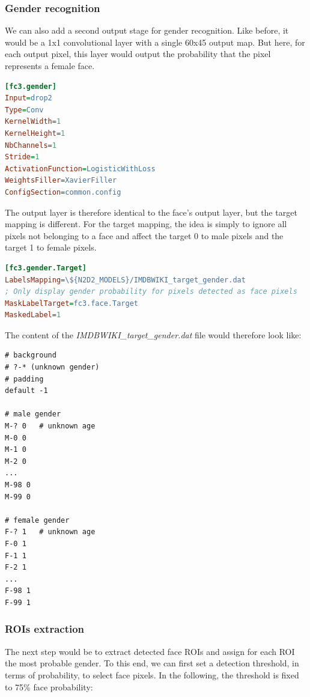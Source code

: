 \documentclass[a4paper,11pt,oneside]{article}
\begin{document}
\subsubsection{Gender recognition}

We can also add a second output stage for gender recognition. Like before, it
would be a 1x1 convolutional layer with a single 60x45 output map. But here, for
each output pixel, this layer would output the probability that the pixel
represents a female face.

\begin{lstlisting}[language=ini]
[fc3.gender]
Input=drop2
Type=Conv
KernelWidth=1
KernelHeight=1
NbChannels=1
Stride=1
ActivationFunction=LogisticWithLoss
WeightsFiller=XavierFiller
ConfigSection=common.config
\end{lstlisting}

The output layer is therefore identical to the face's output layer, but the
target mapping is different. For the target mapping, the idea is simply to
ignore all pixels not belonging to a face and affect the target 0 to male pixels
and the target 1 to female pixels.

\begin{lstlisting}[language=ini]
[fc3.gender.Target]
LabelsMapping=\${N2D2_MODELS}/IMDBWIKI_target_gender.dat
; Only display gender probability for pixels detected as face pixels
MaskLabelTarget=fc3.face.Target
MaskedLabel=1
\end{lstlisting}

The content of the \emph{IMDBWIKI\_target\_gender.dat} file would therefore look
like:

\begin{lstlisting}
# background
# ?-* (unknown gender)
# padding
default -1

# male gender
M-? 0   # unknown age
M-0 0
M-1 0
M-2 0
...
M-98 0
M-99 0

# female gender
F-? 1   # unknown age
F-0 1
F-1 1
F-2 1
...
F-98 1
F-99 1
\end{lstlisting}

\subsubsection{ROIs extraction}

The next step would be to extract detected face ROIs and assign for each ROI the
most probable gender. To this end, we can first set a detection threshold, in
terms of probability, to select face pixels. In the following, the threshold is
fixed to 75\% face probability:
\end{document}
